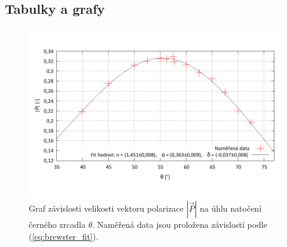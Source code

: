 \documentclass[english]{article}
\begin{document}
%
	
\clearpage
\subsection{Tabulky a grafy}

		\begin{figure}[h!]
		\begin{center}
		    \vspace*{-1cm}
			\includegraphics[width=\linewidth]{../gnuplot/1_pola.pdf}
		    \vspace*{-2cm}
			\caption{Graf závislosti velikosti vektoru polarizace $|\vec{P}|$ na úhlu natočení černého zrcadla $\theta$. Naměřená data jsou proložena závislostí podle (\ref{eq:brewster_fit}).}
			\label{fig:g_brewsteruv_uhel}
		\end{center}
		\end{figure}
		
\end{document}
